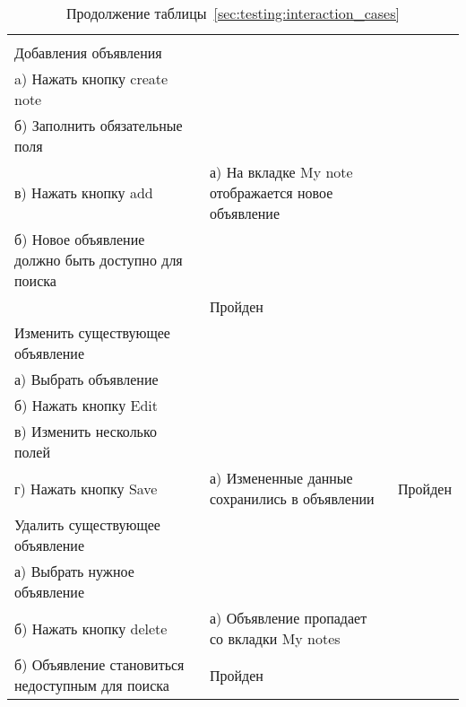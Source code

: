 \begin{longtable}[l]{| >{\raggedright}m{}
                  | >{\raggedright}m{}
                  | >{\raggedright\arraybackslash}m{}|}

  \pagebreak
  \caption*{Продолжение таблицы~\ref{sec:testing:interaction_cases}} \\
   \hline
   \centering 1 & \centering 2 & \centering 3 \tabularnewline
   \hline

   Добавления объявления \\
   a) Нажать кнопку create note  \\
   б) Заполнить обязательные поля \\
   в) Нажать кнопку add
   &
   а) На вкладке My note отображается новое объявление\\
   б) Новое объявление должно быть доступно для поиска \\
   &
   Пройден\\
   \hline


   Изменить существующее объявление \\
   а) Выбрать объявление \\
   б) Нажать кнопку Edit \\
   в) Изменить несколько полей \\
   г) Нажать кнопку Save
   &
   а) Измененные данные сохранились в объявлении
   &
   Пройден \\
   \hline

   Удалить существующее объявление \\
   а) Выбрать нужное объявление \\
   б) Нажать кнопку delete
   &
   а) Объявление пропадает со вкладки My notes \\
   б) Объявление становиться недоступным для поиска 
   &
   Пройден \\
   \hline
   

\end{longtable}
